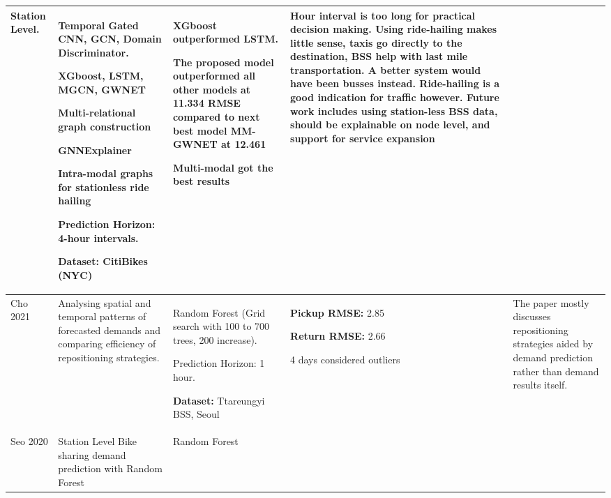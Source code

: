 \documentclass{article}
\begin{document}
\begin{center}
\begin{longtable}{ | m{4em} | m{14em} | m{14em} | m{13em} | m{17em} |}
    Station Level.
    &
    Temporal Gated CNN, GCN, Domain Discriminator.
    
    XGboost, LSTM, MGCN, GWNET
    
    Multi-relational graph construction
    
    GNNExplainer
    
    Intra-modal graphs for stationless ride hailing
    
    Prediction Horizon: 4-hour intervals.
    
    \textbf{Dataset:} CitiBikes (NYC)
    &
    XGboost outperformed LSTM.
    
    The proposed model outperformed all other models at 11.334 RMSE compared to next best model MM-GWNET at 12.461
    
    Multi-modal got the best results

    &
      \newline
    4 Hour interval is too long for practical decision making.
    Using ride-hailing makes little sense, taxis go directly to the destination, BSS help with last mile transportation. A better system would have been busses instead. Ride-hailing is a good indication for traffic however.
    Future work includes using station-less BSS data, should be explainable on node level, and support for service expansion

    \\
    
   \hline
    
      Cho 2021 &\newline \cite{Cho2021} Analysing spatial and temporal patterns of forecasted demands and comparing efficiency of repositioning strategies.\newline &

      Random Forest (Grid search with 100 to 700 trees, 200 increase).

      Prediction Horizon: 1 hour.

     \textbf{Dataset:}  Ttareungyi BSS, Seoul
      &
      \newline
      \textbf{Pickup RMSE:} 2.85
      
      \textbf{Return RMSE:} 2.66 
      
      4 days considered outliers
      &
      The paper mostly discusses repositioning strategies aided by demand prediction rather than demand results itself.

      \\
   \hline
    Seo 2020 &\cite{Seo2021} Station Level Bike sharing demand prediction with Random Forest & Random Forest



\end{longtable}
\end{center}
\end{document}
